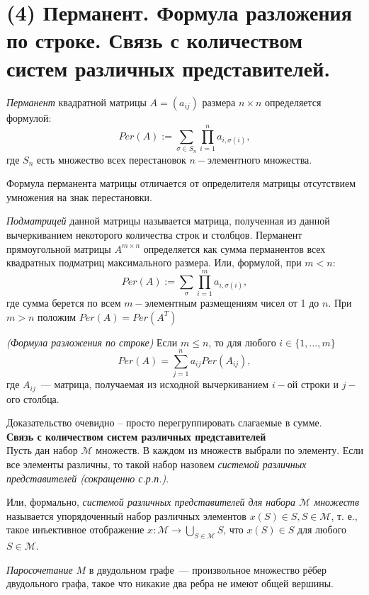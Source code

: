 \section{(4) Перманент. Формула разложения по строке. Связь с количеством систем различных представителей.}

\Def \textit{Перманент} квадратной матрицы $A = (a_{ij})$ размера $n \times n$ определяется формулой:
$$Per(A) := \sum \limits_{\sigma \in S_n}\prod \limits_{i=1}^n a_{i,\sigma(i)},$$
где $S_n$ есть множество всех перестановок $n-$элементного множества.

Формула перманента матрицы отличается от определителя матрицы отсутствием умножения на знак перестановки.

\Def \textit{Подматрицей} данной матрицы называется матрица, полученная из данной вычеркиванием некоторого количества строк и столбцов. Перманент прямоугольной матрицы $A^{m \times n}$ определяется как сумма перманентов всех квадратных подматриц максимального размера. Или, формулой, при $m < n$:
$$Per(A) := \sum \limits_{\sigma}\prod \limits_{i=1}^m a_{i,\sigma(i)},$$
где сумма берется по всем $m-$элементным размещениям чисел от 1 до $n$. При $m > n$ положим $Per(A) = Per(A^T)$

\Th \textit{(Формула разложения по строке)} Если $m \leq n$, то для любого $i \in \{1, \ldots, m\}$
$$Per(A) = \sum \limits_{j=1}^n a_{ij}Per(A_{ij}),$$
где $A_{ij}$~--- матрица, получаемая из исходной вычеркиванием $i-$ой строки и $j-$ого столбца.

Доказательство очевидно -- просто перегруппировать слагаемые в сумме.\\

\textbf{Связь с количеством систем различных представителей}\\

\Def Пусть дан набор $\mathcal M$ множеств. В каждом из множеств выбрали по элементу. Если все элементы различны, то такой набор назовем \textit{системой различных представителей (сокращенно с.р.п.)}.

Или, формально, \textit{системой различных представителей для набора $\mathcal{M}$ множеств} называется упорядоченный набор различных элементов $x(S) \in S, S \in \mathcal{M}$, т. е., такое инъективное отображение $x : \mathcal{M} \rightarrow \bigcup\limits_{S \in \mathcal{M}}S$, что $x(S) \in S$ для любого $S \in \mathcal{M}$.

\Def \textit{Паросочетание} $M$ в двудольном графе~--- произвольное множество рёбер двудольного графа, такое что никакие два ребра не имеют общей вершины.

